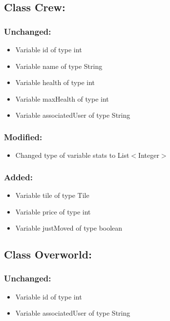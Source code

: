 \documentclass{article}
\begin{document}

\subsection{Class Crew:}

\subsubsection{Unchanged:}
\begin{itemize}
\item Variable id of type int
\item Variable name of type String
\item Variable health of type int
\item Variable maxHealth of type int
\item Variable associatedUser of type String
\end{itemize}

\subsubsection{Modified:}
\begin{itemize}
\item Changed type of variable stats to List$<$Integer$>$
\end{itemize}

\subsubsection{Added:}
\begin{itemize}
\item Variable tile of type Tile
\item Variable price of type int
\item Variable justMoved of type boolean
\end{itemize}


\subsection{Class Overworld:}

\subsubsection{Unchanged:}
\begin{itemize}
\item Variable id of type int
\item Variable associatedUser of type String
\end{itemize}
\end{document}

